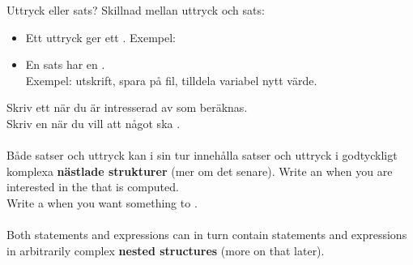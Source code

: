 
\begin{Slide}{Uttryck eller sats?}
Skillnad mellan uttryck och sats:
\begin{itemize}
\item Ett uttryck ger ett . Exempel: 
\item En sats har en . \\Exempel: utskrift, spara på fil, tilldela variabel nytt värde.
\end{itemize}
\ifswedish
Skriv ett  när du är intresserad av  som beräknas.\\
Skriv en  när du vill att något ska .\\~\\
{\SlideFontSmall Både satser och uttryck kan i sin tur innehålla satser och uttryck i godtyckligt komplexa \textbf{nästlade strukturer} (mer om det senare).}
\else
Write an  when you are interested in the  that is computed.\\
Write a  when you want something to .\\~\\
{\SlideFontSmall Both statements and expressions can in turn contain statements and expressions in arbitrarily complex \textbf{nested structures} (more on that later).}
\fi
\end{Slide}


